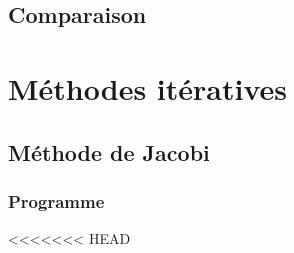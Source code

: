 \documentclass{report}
\begin{document}
    \section{Comparaison}
    \newpage
     
  \chapter{Méthodes itératives}
  	\section{Méthode de Jacobi}
  	  \subsection{Programme}
        
      \newpage
<<<<<<< HEAD
\end{document}
